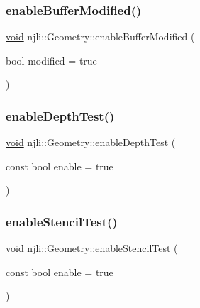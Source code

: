 \mbox{\label{classnjli_1_1_geometry_a3729511d4f34251e0ac1df3135c2a00f}} 
\subsubsection{\texorpdfstring{enable\+Buffer\+Modified()}{enableBufferModified()}}
{\footnotesize\ttfamily \mbox{\hyperlink{_thread_8h_af1e856da2e658414cb2456cb6f7ebc66}{void}} njli\+::\+Geometry\+::enable\+Buffer\+Modified (\begin{DoxyParamCaption}\item[{bool}]{modified = {\ttfamily true} }\end{DoxyParamCaption})\hspace{0.3cm}{\ttfamily [protected]}}

\mbox{\label{classnjli_1_1_geometry_a4270551bf9c0f0ade7ce5b0fd16f78d8}} 
\subsubsection{\texorpdfstring{enable\+Depth\+Test()}{enableDepthTest()}}
{\footnotesize\ttfamily \mbox{\hyperlink{_thread_8h_af1e856da2e658414cb2456cb6f7ebc66}{void}} njli\+::\+Geometry\+::enable\+Depth\+Test (\begin{DoxyParamCaption}\item[{const bool}]{enable = {\ttfamily true} }\end{DoxyParamCaption})}

\mbox{\label{classnjli_1_1_geometry_a66c3dcdcfb2fcc30bc0520f280b87ab0}} 
\subsubsection{\texorpdfstring{enable\+Stencil\+Test()}{enableStencilTest()}}
{\footnotesize\ttfamily \mbox{\hyperlink{_thread_8h_af1e856da2e658414cb2456cb6f7ebc66}{void}} njli\+::\+Geometry\+::enable\+Stencil\+Test (\begin{DoxyParamCaption}\item[{const bool}]{enable = {\ttfamily true} }\end{DoxyParamCaption})}

